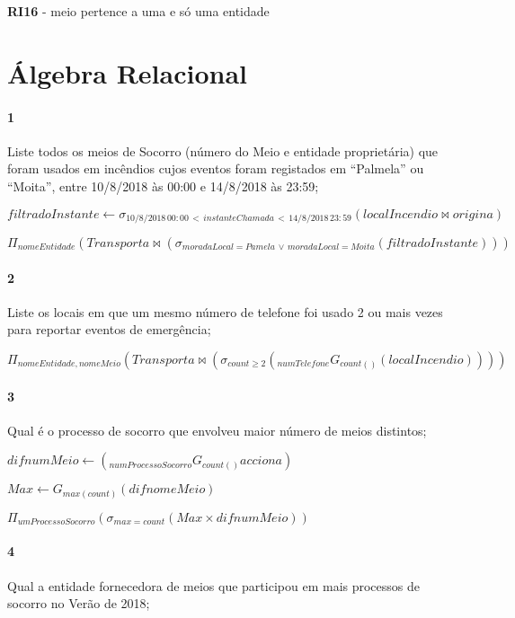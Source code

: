 \documentclass[12pt,a4paper]{article}
\begin{document}
\textbf{RI16} - meio pertence a uma e s\'o uma entidade \\


\section{Álgebra Relacional}
\paragraph{1}
Liste todos os meios de Socorro (número do Meio e entidade proprietária) que foram
usados em incêndios cujos eventos foram registados em “Palmela” ou “Moita”, entre
10/8/2018 às 00:00 e 14/8/2018 às 23:59;

$filtradoInstante \leftarrow \sigma_{10/8/2018\,00:00\, < \, instanteChamada\,  < \, 14/8/2018 \, 23:59} (localIncendio \bowtie origina)$

$\Pi_{nomeEntidade}\left ( Transporta \bowtie \left (  \sigma_{moradaLocal=Pamela\, \vee \, moradaLocal=Moita } \left ( filtradoInstante \right )\right ) \right )$

\paragraph{2}
Liste os locais em que um mesmo número de telefone foi usado 2 ou mais vezes para
reportar eventos de emergência;

$\Pi_{nomeEntidade, nomeMeio} \left ( Transporta \bowtie \left ( \sigma_{count\geq 2}  \left (_{numTelefone}G_{count()}  \left (localIncendio \right ) \right ) \right ) \right )$

\paragraph{3}
Qual é o processo de socorro que envolveu maior número de meios distintos;

$difnumMeio \leftarrow\left ( _{numProcessoSocorro}G_{count()}acciona \right )$

$Max \leftarrow G_{max(count)} \left ( difnomeMeio \right )$

$\Pi_{umProcessoSocorro}\left ( \sigma _{max=count}\left ( Max\times difnumMeio \right ) \right )$

\paragraph{4}
Qual a entidade fornecedora de meios que participou em mais processos de socorro no
Verão de 2018;
\end{document}
